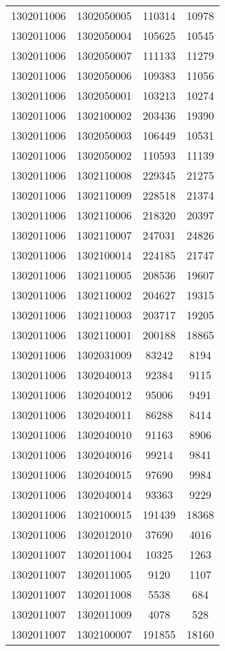 \begin{longtable}{llcc}
1302011006 & 1302050005 & 110314 & 10978\\
1302011006 & 1302050004 & 105625 & 10545\\
1302011006 & 1302050007 & 111133 & 11279\\
1302011006 & 1302050006 & 109383 & 11056\\
1302011006 & 1302050001 & 103213 & 10274\\
1302011006 & 1302100002 & 203436 & 19390\\
1302011006 & 1302050003 & 106449 & 10531\\
1302011006 & 1302050002 & 110593 & 11139\\
1302011006 & 1302110008 & 229345 & 21275\\
1302011006 & 1302110009 & 228518 & 21374\\
1302011006 & 1302110006 & 218320 & 20397\\
1302011006 & 1302110007 & 247031 & 24826\\
1302011006 & 1302100014 & 224185 & 21747\\
1302011006 & 1302110005 & 208536 & 19607\\
1302011006 & 1302110002 & 204627 & 19315\\
1302011006 & 1302110003 & 203717 & 19205\\
1302011006 & 1302110001 & 200188 & 18865\\
1302011006 & 1302031009 & 83242 & 8194\\
1302011006 & 1302040013 & 92384 & 9115\\
1302011006 & 1302040012 & 95006 & 9491\\
1302011006 & 1302040011 & 86288 & 8414\\
1302011006 & 1302040010 & 91163 & 8906\\
1302011006 & 1302040016 & 99214 & 9841\\
1302011006 & 1302040015 & 97690 & 9984\\
1302011006 & 1302040014 & 93363 & 9229\\
1302011006 & 1302100015 & 191439 & 18368\\
1302011006 & 1302012010 & 37690 & 4016\\
1302011007 & 1302011004 & 10325 & 1263\\
1302011007 & 1302011005 & 9120 & 1107\\
1302011007 & 1302011008 & 5538 & 684\\
1302011007 & 1302011009 & 4078 & 528\\
1302011007 & 1302100007 & 191855 & 18160\\

\end{longtable}
